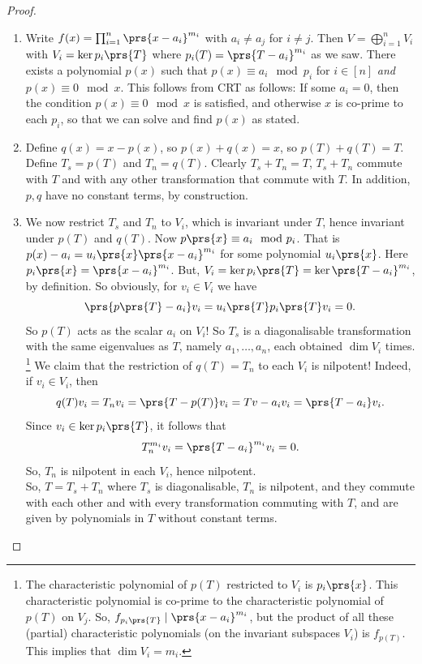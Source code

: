 \documentclass[10pt,a4paper,twoside,openany,hidelinks]{book}
\begin{document}
\begin{proof}
\begin{enumerate}[label = (\Roman*)]
\item
Write $f(x) = \prod_{i=1}^n \prs{x-a_i}^{m_i}$ with $a_i \neq a_j$ for $i \neq j$. Then $V = \bigoplus_{i=1}^n V_i$ with $V_i = \ker p_i\prs{T}$ where $p_i(T) = \prs{T-a_i}^{m_i}$ as we saw. There exists a polynomial $p(x)$ such that $p(x) \equiv a_i \mod{p_i}$ for $i \in [n]$ \emph{and} $p(x) \equiv 0 \mod{x}$. This follows from CRT as follows:
If some $a_i = 0$, then the condition $p(x) \equiv 0 \mod{x}$ is satisfied, and otherwise $x$ is co-prime to each $p_i$, so that we can solve and find $p(x)$ as stated.
\item Define $q(x) = x - p(x)$, so $p(x) + q(x) = x$, so $p(T) + q(T) = T$. Define $T_s = p(T)$ and $T_n = q(T)$. Clearly $T_s + T_n = T$, $T_s + T_n$ commute with $T$ and with any other transformation that commute with $T$. In addition, $p,q$ have no constant terms, by construction.
\item We now restrict $T_s$ and $T_n$ to $V_i$, which is invariant under $T$, hence invariant under $p(T)$ and $q(T)$. Now $p\prs{x} \equiv a_i \mod{p_i}$. That is $p(x) - a_i = u_i\prs{x} \prs{x - a_i}^{m_i}$ for some polynomial $u_i\prs{x}$. Here $p_i\prs{x} = \prs{x-a_i}^{m_i}$.
But, $V_i = \ker p_i\prs{T} = \ker \prs{T - a_i}^{m_i}$, by definition. So obviously, for $v_i \in V_i$ we have \[\prs{p\prs{T} - a_i}v_i = u_i\prs{T}p_i\prs{T}v_i = 0\text{.}\]
So $p(T)$ acts as the scalar $a_i$ on $V_i$! So $T_s$ is a diagonalisable transformation with the same eigenvalues as $T$, namely $a_1, \ldots, a_n$, each obtained $\dim V_i$ times.%
\footnote{{The characteristic polynomial of $p(T)$ restricted to $V_i$ is $p_i\prs{x}$.
This characteristic polynomial is co-prime to the characteristic polynomial of $p(T)$ on $V_j$. So, $f_{p_i\prs{T}} \mid \prs{x-a_i}^{m_i}$, but the product of all these (partial) characteristic polynomials (on the invariant subspaces $V_i$) is $f_{p(T)}$. This implies that $\dim V_i = m_i$.}}%
We claim that the restriction of $q(T) = T_n$ to each $V_i$ is nilpotent! Indeed, if $v_i \in V_i$, then \[q(T)v_i = T_n v_i = \prs{T - p(T)}v_i = Tv - a_i v_i = \prs{T - a_i}v_i \text{.}\]
Since $v_i \in \ker p_i\prs{T}$, it follows that \[T_n^{m_i} v_i = \prs{T - a_i}^{m_i}v_i = 0\text{.}\]
So, $T_n$ is nilpotent in each $V_i$, hence nilpotent.\\
So, $T = T_s + T_n$ where $T_s$ is diagonalisable, $T_n$ is nilpotent, and they commute with each other and with every transformation commuting with $T$, and are given by polynomials in $T$ without constant terms.\\

\end{enumerate}
\end{proof}
\end{document}
